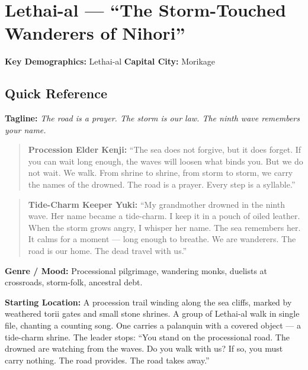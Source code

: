 \section{Lethai-al --- ``The Storm-Touched Wanderers of Nihori''}
\label{chap:lethai-al}

\textbf{Key Demographics: } Lethai-al
\textbf{Capital City: } Morikage

\subsection*{Quick Reference}
\textbf{Tagline:} \textit{The road is a prayer. The storm is our law. The ninth wave remembers your name.}

\begin{quote}
  \textbf{Procession Elder Kenji:}  
  ``The sea does not forgive, but it does forget. If you can wait long enough, the waves will loosen what binds you. But we do not wait. We walk. From shrine to shrine, from storm to storm, we carry the names of the drowned. The road is a prayer. Every step is a syllable.''
\end{quote}

\begin{quote}
  \textbf{Tide-Charm Keeper Yuki:}  
  ``My grandmother drowned in the ninth wave. Her name became a tide-charm. I keep it in a pouch of oiled leather. When the storm grows angry, I whisper her name. The sea remembers her. It calms for a moment --- long enough to breathe. We are wanderers. The road is our home. The dead travel with us.''
\end{quote}

\textbf{Genre / Mood:} Processional pilgrimage, wandering monks, duelists at crossroads, storm-folk, ancestral debt.

\textbf{Starting Location:} A procession trail winding along the sea cliffs, marked by weathered torii gates and small stone shrines. A group of Lethai-al walk in single file, chanting a counting song. One carries a palanquin with a covered object --- a tide-charm shrine. The leader stops: ``You stand on the processional road. The drowned are watching from the waves. Do you walk with us? If so, you must carry nothing. The road provides. The road takes away.''

